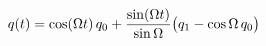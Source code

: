 \documentclass[preview]{standalone}
\begin{document}
\begin{align*}
\special{dvisvgm:raw <g id='unique000'>}q(t)=\cos(\Omega t)\,q_0+\frac{\sin(\Omega t)}{\sin\Omega}\bigl(q_1-\cos\Omega\,q_0\bigr)\special{dvisvgm:raw </g>}
\end{align*}
\end{document}
